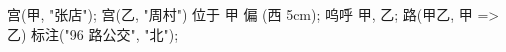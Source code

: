 \usemodule[zhfonts]

宫(甲, "张店");
宫(乙, "周村") 位于 甲 偏 (西 5cm);
呜呼 甲, 乙;
路(甲乙, 甲 => 乙) 标注("96 路公交", "北");
\stopuseMPgraphic

\startTEXpage[offset=4pt]
\stopTEXpage
